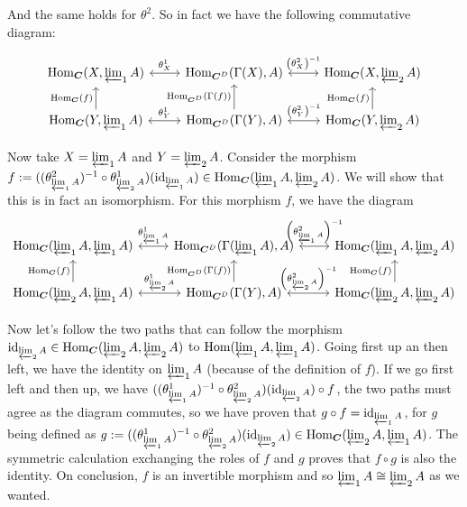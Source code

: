 \begin{sol}
\begin{enumerate}[label=\alph*)]
		And the same holds for $\theta^2$. So in fact we have the following commutative diagram:

		\[
			\begin{tikzcd}
				\Hom_{\Cat}(X, \varprojlim_1 A) \arrow[r, "\theta^1_{X}", leftrightarrow] 
				  & \Hom_{\Cat^D} (\Gamma(X), A) \arrow[r, "\left (\theta^2_{X} \right )^{-1}", leftrightarrow] 
				  & \Hom_{\Cat}(X, \varprojlim_2 A) \\
				\Hom_{\Cat}(Y, \varprojlim_1 A) \arrow[r, "\theta^1_{Y}", leftrightarrow] \arrow[u, "\Hom_{\Cat} \left ( f \right )"]
				  & \Hom_{\Cat^D} (\Gamma(Y), A) \arrow[u, "\Hom_{\Cat^D} \left ( \Gamma \left (f \right ) \right )"] \arrow[r, "\left (\theta^2_{Y} \right )^{-1}", leftrightarrow]
				  & \Hom_{\Cat}(Y, \varprojlim_2 A) \arrow[u, "\Hom_{\Cat} \left ( f \right )"]
			\end{tikzcd}
		\] 

		Now take $X = \varprojlim_1 A$ and $Y = \varprojlim_2 A$. Consider the morphism $f := ((\theta^2_{\varprojlim_1 A})^{-1} \circ \theta^1_{\varprojlim_2 A})(\text{id}_{\varprojlim_1 A}) \in \mathrm{Hom}_{\boldsymbol{C}}(\varprojlim_1 A, \varprojlim_2 A)$. We will show that this is in fact an isomorphism. For this morphism $f$, we have the diagram
		\[
			\begin{tikzcd}
				\Hom_{\Cat}(\varprojlim_1 A, \varprojlim_1 A) \arrow[r, "\theta^1_{\varprojlim_1 A}", leftrightarrow] 
				  & \Hom_{\Cat^D} (\Gamma(\varprojlim_1 A), A) \arrow[r, "\left (\theta^2_{\varprojlim_1 A} \right )^{-1}", leftrightarrow] 
				  & \Hom_{\Cat}(\varprojlim_1 A, \varprojlim_2 A) \\
				\Hom_{\Cat}(\varprojlim_2 A, \varprojlim_1 A) \arrow[r, "\theta^1_{\varprojlim_2 A}", leftrightarrow] \arrow[u, "\Hom_{\Cat} \left ( f \right )"]
				  & \Hom_{\Cat^D} (\Gamma(Y), A) \arrow[u, "\Hom_{\Cat^D} \left ( \Gamma \left (f \right ) \right )"] \arrow[r, "\left (\theta^2_{\varprojlim_2 A} \right )^{-1}", leftrightarrow]
				  & \Hom_{\Cat}(\varprojlim_2 A, \varprojlim_2 A) \arrow[u, "\Hom_{\Cat} \left ( f \right )"]
			\end{tikzcd}
		\] 

		Now let's follow the two paths that can follow the morphism $\text{id}_{\varprojlim_2 A} \in \mathrm{Hom}_{\boldsymbol{C}}(\varprojlim_2 A,\varprojlim_2 A)$ to $\mathrm{Hom}(\varprojlim_1 A,\varprojlim_1 A)$. Going first up an then left, we have the identity on $\varprojlim_1 A$ (because of the definition of $f$). If we go first left and then up, we have $((\theta^1_{\varprojlim_1 A})^{-1} \circ \theta^2_{\varprojlim_2 A})(\text{id}_{\varprojlim_2 A}) \circ f$, the two paths must agree as the diagram commutes, so we have proven that $g \circ f = \text{id}_{\varprojlim_1 A}$, for $g$ being defined as $g := ((\theta^1_{\varprojlim_1 A})^{-1} \circ \theta^2_{\varprojlim_2 A})(\text{id}_{\varprojlim_2 A}) \in \mathrm{Hom}_{\boldsymbol{C}}(\varprojlim_2 A, \varprojlim_1 A)$. The symmetric calculation exchanging the roles of $f$ and $g$ proves that $f \circ g$ is also the identity. On conclusion, $f$ is an invertible morphism and so $\varprojlim_1 A \cong \varprojlim_2 A$ as we wanted.


\end{enumerate}
\end{sol}

